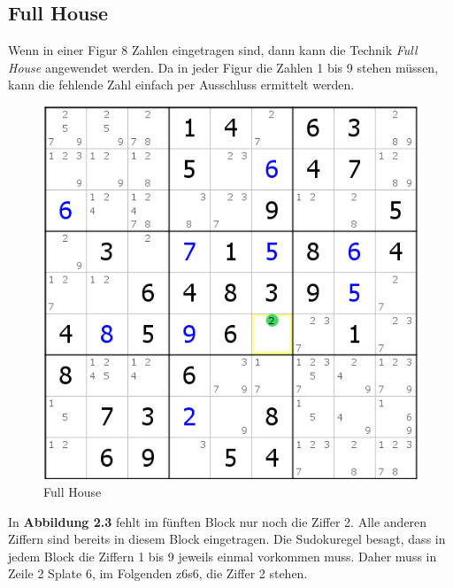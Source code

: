 \newpage
\subsection{Full House}
\label{Full_House}
Wenn in einer Figur 8 Zahlen eingetragen sind, dann kann die Technik \textit{Full House} angewendet werden. Da in jeder Figur die Zahlen 1 bis 9 stehen müssen, kann die fehlende Zahl einfach per Ausschluss ermittelt werden.\\

\begin{figure}[h]
\begin{center}
\includegraphics{./img/full_house.png}
\caption{Full House}
\end{center}
\end{figure}

\noindent In \textbf{Abbildung 2.3} fehlt im fünften Block nur noch die Ziffer 2. Alle anderen Ziffern sind bereits in diesem Block eingetragen. Die Sudokuregel besagt, dass in jedem Block die Ziffern 1 bis 9 jeweils einmal vorkommen muss. Daher muss in Zeile 2 Splate 6, im Folgenden z6s6, die Ziffer 2 stehen.